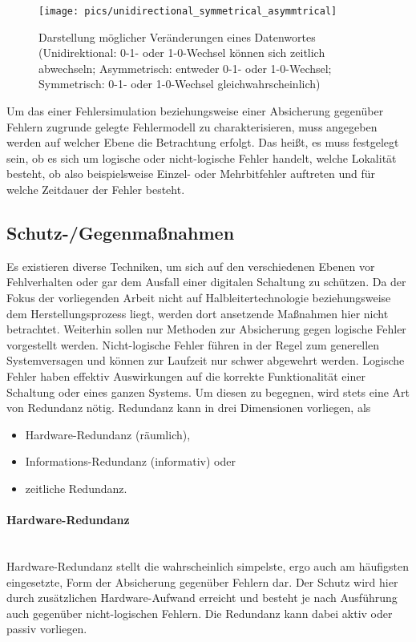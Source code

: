 \begin{figure}[htbp]
	\centering
		\texttt{[image: pics/unidirectional\_symmetrical\_asymmtrical]}
	\caption[Darstellung möglicher Veränderungen eines
        Datenwortes]{Darstellung möglicher Veränderungen eines
          Datenwortes (Unidirektional: 0-1- oder 1-0-Wechsel können
          sich zeitlich abwechseln; Asymmetrisch: entweder 0-1- oder
          1-0-Wechsel; Symmetrisch: 0-1- oder 1-0-Wechsel gleichwahrscheinlich)}
	\label{fig:grundlagen_softerrors_uni_sym_asym}
\end{figure}

Um das einer Fehlersimulation beziehungsweise einer Absicherung
gegenüber Fehlern zugrunde gelegte Fehlermodell zu charakterisieren,
muss angegeben werden auf welcher Ebene die Betrachtung erfolgt. Das
heißt, es muss festgelegt sein, ob es sich um logische oder
nicht-logische Fehler handelt, welche Lokalität besteht, ob also
beispielsweise Einzel- oder Mehrbitfehler auftreten und für welche
Zeitdauer der Fehler besteht.

\subsection{Schutz-/Gegenmaßnahmen}
\label{sec:grundlagen_gegenmassnahmen}

Es existieren diverse Techniken, um sich auf den verschiedenen Ebenen
vor Fehlverhalten oder gar dem Ausfall einer digitalen Schaltung zu
schützen. Da der Fokus der vorliegenden Arbeit nicht auf
Halbleitertechnologie beziehungsweise dem Herstellungsprozess liegt,
werden dort ansetzende Maßnahmen hier nicht betrachtet. Weiterhin
sollen nur Methoden zur Absicherung gegen logische Fehler vorgestellt
werden. Nicht-logische Fehler führen in der Regel zum generellen
Systemversagen und können zur Laufzeit nur schwer abgewehrt
werden. Logische Fehler haben effektiv Auswirkungen auf die korrekte
Funktionalität einer Schaltung oder eines ganzen Systems. Um diesen zu
begegnen, wird stets eine Art von Redundanz nötig. Redundanz kann in
drei Dimensionen vorliegen, als 
\begin{itemize}
 \item Hardware-Redundanz (räumlich), 
 \item Informations-Redundanz (informativ) oder
 \item zeitliche Redundanz.
\end{itemize}

\paragraph{Hardware-Redundanz}\hspace{0cm}\\
\label{sec:grundlagen_fehler_schutz_hwredundanz}
Hardware-Redundanz stellt die wahrscheinlich simpelste, ergo auch am
häufigsten eingesetzte, Form der Absicherung gegenüber Fehlern
dar. Der Schutz wird hier durch zusätzlichen Hardware-Aufwand erreicht
und besteht je nach Ausführung auch gegenüber nicht-logischen
Fehlern. Die Redundanz kann dabei aktiv oder passiv vorliegen.

